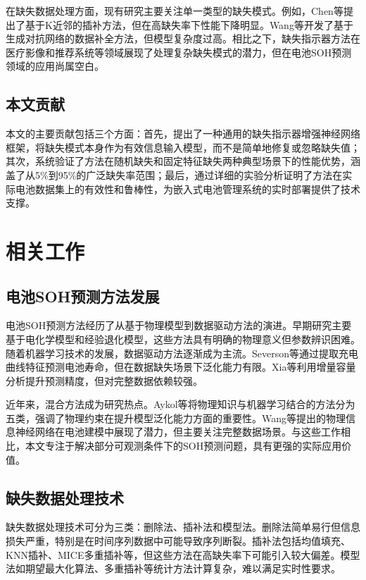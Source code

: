 \documentclass{ctexart}
\begin{document}
在缺失数据处理方面，现有研究主要关注单一类型的缺失模式。例如，Chen等\cite{chen2021physics}提出了基于K近邻的插补方法，但在高缺失率下性能下降明显。Wang等\cite{wang2023explainability}开发了基于生成对抗网络的数据补全方法，但模型复杂度过高。相比之下，缺失指示器方法在医疗影像\cite{che2023health}和推荐系统\cite{li2022machine}等领域展现了处理复杂缺失模式的潜力，但在电池SOH预测领域的应用尚属空白。

\subsection{本文贡献}
本文的主要贡献包括三个方面：首先，提出了一种通用的缺失指示器增强神经网络框架，将缺失模式本身作为有效信息输入模型，而不是简单地修复或忽略缺失值；其次，系统验证了方法在随机缺失和固定特征缺失两种典型场景下的性能优势，涵盖了从5\%到95\%的广泛缺失率范围；最后，通过详细的实验分析证明了方法在实际电池数据集上的有效性和鲁棒性，为嵌入式电池管理系统的实时部署提供了技术支撑。

\section{相关工作}

\subsection{电池SOH预测方法发展}
电池SOH预测方法经历了从基于物理模型到数据驱动方法的演进。早期研究主要基于电化学模型\cite{fuller1994simulation}和经验退化模型\cite{baghdadi2016lithium}，这些方法具有明确的物理意义但参数辨识困难。随着机器学习技术的发展，数据驱动方法逐渐成为主流。Severson等\cite{severson2019data}通过提取充电曲线特征预测电池寿命，但在数据缺失场景下泛化能力有限。Xia等\cite{xia2023state}利用增量容量分析提升预测精度，但对完整数据依赖较强。

近年来，混合方法成为研究热点。Aykol等\cite{aykol2021perspective}将物理知识与机器学习结合的方法分为五类，强调了物理约束在提升模型泛化能力方面的重要性。Wang等\cite{wang2024physics}提出的物理信息神经网络在电池建模中展现了潜力，但主要关注完整数据场景。与这些工作相比，本文专注于解决部分可观测条件下的SOH预测问题，具有更强的实际应用价值。

\subsection{缺失数据处理技术}
缺失数据处理技术可分为三类：删除法、插补法和模型法。删除法简单易行但信息损失严重，特别是在时间序列数据中可能导致序列断裂。插补法包括均值填充、KNN插补\cite{chen2021physics}、MICE多重插补等，但这些方法在高缺失率下可能引入较大偏差。模型法如期望最大化算法、多重插补等统计方法计算复杂，难以满足实时性要求。
\end{document}
